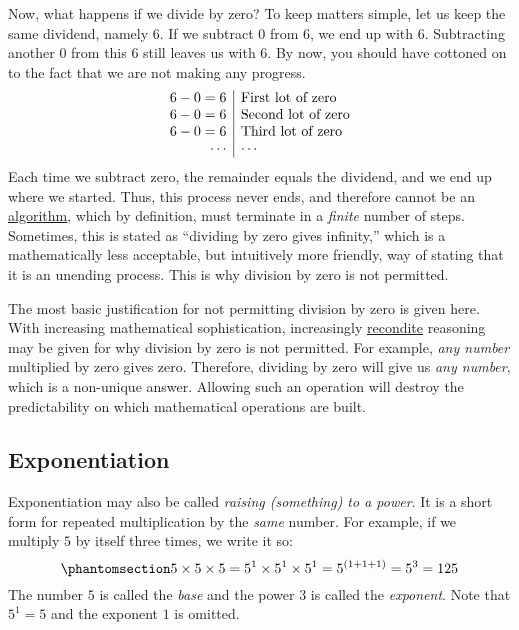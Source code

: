 \documentclass[
  a4paper,
]{article}
\begin{document}
Now, what happens if we divide by zero? To keep matters simple, let us
keep the same dividend, namely 6. If we subtract 0 from 6, we end up
with 6. Subtracting another 0 from this 6 still leaves us with 6. By
now, you should have cottoned on to the fact that we are not making any
progress. \[
\begin{array}{r | l}
6 - 0 = 6 & \mbox{First lot of zero}\\
6 - 0 = 6 & \mbox{Second lot of zero}\\
6 - 0 = 6 & \mbox{Third lot of zero}\\
\cdots & \cdots\\
\end{array}
\] Each time we subtract zero, the remainder equals the dividend, and we
end up where we started. Thus, this process never ends, and therefore
cannot be an
\href{https://mathworld.wolfram.com/Algorithm.html}{algorithm}, which by
definition, must terminate in a \emph{finite} number of steps.
Sometimes, this is stated as ``dividing by zero gives infinity,'' which
is a mathematically less acceptable, but intuitively more friendly, way
of stating that it is an unending process. This is why division by zero
is not permitted.

The most basic justification for not permitting division by zero is
given here. With increasing mathematical sophistication, increasingly
\href{https://www.merriam-webster.com/dictionary/recondite}{recondite}
reasoning may be given for why division by zero is not permitted. For
example, \emph{any number} multiplied by zero gives zero. Therefore,
dividing by zero will give us \emph{any number}, which is a non-unique
answer. Allowing such an operation will destroy the predictability on
which mathematical operations are built.

\subsection{Exponentiation}\label{exponentiation}

Exponentiation may also be called \emph{raising (something) to a power}.
It is a short form for repeated multiplication by the \emph{same}
number. For example, if we multiply \(5\) by itself three times, we
write it so: \begin{equation}\phantomsection\label{eq:exp}{
5\times5\times5 = 5^1\times5^1\times5^1 = 5^{(1+1+1)} = 5^{3} = 125
}\end{equation} The number \(5\) is called the \emph{base} and the power
\(3\) is called the \emph{exponent}. Note that \(5^1 = 5\) and the
exponent \(1\) is omitted.
\end{document}
